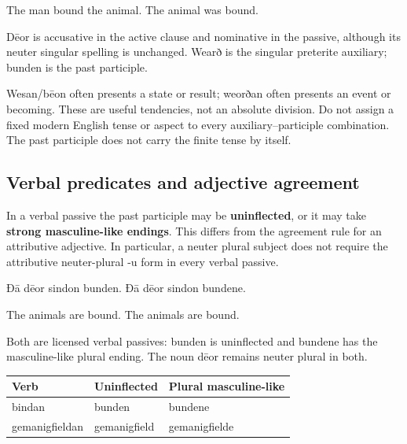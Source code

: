 The man bound the animal. The animal was bound.

Dēor is accusative in the active clause and nominative in the passive, although its neuter singular spelling is unchanged. Wearð is the singular preterite auxiliary; bunden is the past participle.

Wesan/\allowbreak{}bēon often presents a state or result; weorðan often presents an event or becoming. These are useful tendencies, not an absolute division. Do not assign a fixed modern English tense or aspect to every auxiliary–participle combination. The past participle does not carry the finite tense by itself.

\subsection*{Verbal predicates and adjective agreement}

In a verbal passive the past participle may be \textbf{uninflected}, or it may take \textbf{strong masculine-like endings}. This differs from the agreement rule for an attributive adjective. In particular, a neuter plural subject does not require the attributive neuter-plural -u form in every verbal passive.

Ðā dēor sindon bunden. Ðā dēor sindon bundene.

The animals are bound. The animals are bound.

Both are licensed verbal passives: bunden is uninflected and bundene has the masculine-like plural ending. The noun dēor remains neuter plural in both.

\par\begingroup
\fontsize{10.5}{13.2}\selectfont
\setlength{\LTleft}{0pt}\setlength{\LTright}{\fill}
\noindent
\begin{tabular}{@{}>{\raggedright\arraybackslash}p{38.41mm}>{\raggedright\arraybackslash}p{32.92mm}>{\raggedright\arraybackslash}p{47.05mm}@{}}
\toprule
\textbf{Verb} & \textbf{Uninflected} & \textbf{Plural masculine-like} \\
\midrule
bindan & bunden & bundene \\
gemanigfieldan & gemanigfield & gemanigfielde \\
\bottomrule
\end{tabular}
\par\endgroup

